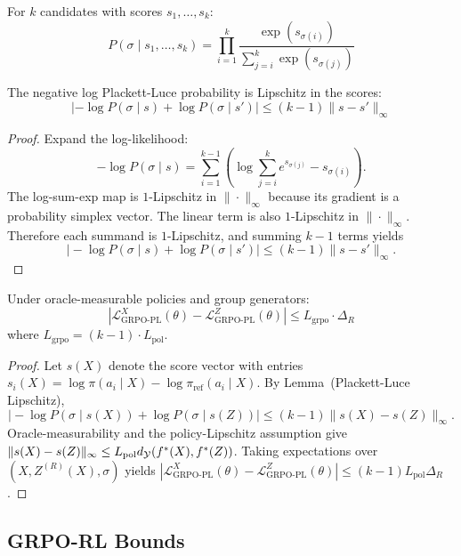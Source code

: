 \begin{definition}
For $k$ candidates with scores $s_1, \ldots, s_k$:
\[
P(\sigma \mid s_1, \ldots, s_k) = \prod_{i=1}^{k} \frac{\exp(s_{\sigma(i)})}{\sum_{j=i}^{k} \exp(s_{\sigma(j)})}
\]
\end{definition}

\begin{lemma}
The negative log Plackett-Luce probability is Lipschitz in the scores:
\[
\left|-\log P(\sigma \mid s) + \log P(\sigma \mid s')\right| \le (k-1) \|s - s'\|_\infty
\]
\end{lemma}

\begin{proof}
Expand the log-likelihood:
\[
-\log P(\sigma \mid s)=\sum_{i=1}^{k-1}\left(\log\sum_{j=i}^k e^{s_{\sigma(j)}}-s_{\sigma(i)}\right).
\]
The log-sum-exp map is $1$-Lipschitz in $\|\cdot\|_\infty$ because its gradient is a probability simplex vector. The linear term is also $1$-Lipschitz in $\|\cdot\|_\infty$. Therefore each summand is $1$-Lipschitz, and summing $k-1$ terms yields
\[
\big|-\log P(\sigma \mid s)+\log P(\sigma \mid s')\big|\le (k-1)\|s-s'\|_\infty.
\]
\end{proof}

\begin{theorem}
Under oracle-measurable policies and group generators:
\[
|\mathcal{L}^X_{\text{GRPO-PL}}(\theta) - \mathcal{L}^Z_{\text{GRPO-PL}}(\theta)| \le L_{\text{grpo}} \cdot \Delta_R
\]
where $L_{\text{grpo}} = (k-1) \cdot L_{\text{pol}}$.
\end{theorem}

\begin{proof}
Let $s(X)$ denote the score vector with entries $s_i(X)=\log\pi(a_i\mid X)-\log\pi_{\text{ref}}(a_i\mid X)$. By Lemma~(Plackett-Luce Lipschitz),
\[
\big|-\log P(\sigma\mid s(X))+\log P(\sigma\mid s(Z))\big|
\le (k-1)\|s(X)-s(Z)\|_\infty.
\]
Oracle-measurability and the policy-Lipschitz assumption give
$\|s(X)-s(Z)\|_\infty \le L_{\text{pol}}d_{\mathcal{Y}}(f^{\ast}(X),f^{\ast}(Z))$.
Taking expectations over $(X,Z^{(R)}(X),\sigma)$ yields
$|\mathcal{L}^X_{\text{GRPO-PL}}(\theta)-\mathcal{L}^Z_{\text{GRPO-PL}}(\theta)| \le (k-1)L_{\text{pol}}\Delta_R$.
\end{proof}

\subsection{GRPO-RL Bounds}

